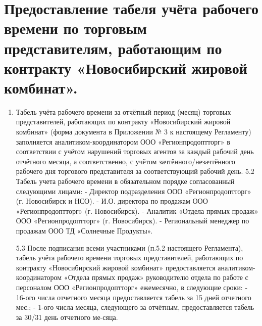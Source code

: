 \section{Предоставление табеля учёта рабочего времени по торговым представителям, работающим по контракту «Новосибирский жировой комбинат».}
\begin{enumerate}[\thesection .1]
\item Табель учёта рабочего времени за отчётный период (месяц) торговых представителей, работающих по контракту «Новосибирский жировой комбинат» (форма документа в Приложении № 3 к настоящему Регламенту) заполняется аналитиком-координатором ООО «Регионпродоптторг» в соответствии с учётом нарушений торговых агентов за каждый рабочий день отчётного месяца, а соответственно, с учётом зачтённого/незачтённого рабочего дня торгового представителя за соответствующий рабочий день. 
 5.2 Табель учета рабочего времени в обязательном порядке согласованный следующими лицами:
 - Директор подразделения ООО «Регионпродоптторг» (г. Новосибирск и НСО).
 - И.О. директора по продажам ООО «Регионпродоптторг» (г. Новосибирск).
 - Аналитик «Отдела прямых продаж» ООО «Регионпродоптторг» (г. Новосибирск). 
 - Региональный менеджер по продажам ООО ТД «Солнечные Продукты».

 5.3  После подписания всеми участниками (п.5.2 настоящего Регламента), табель учёта рабочего времени торговых представителей, работающих по контракту «Новосибирский жировой комбинат» предоставляется аналитиком-координатором «Отдела прямых продаж» руководителю отдела по работе с персоналом ООО «Регионпродоптторг» ежемесячно, в следующие сроки:
 - 16-ого числа отчетного месяца предоставляется табель за 15 дней отчетного мес.;
 - 1-ого числа месяца, следующего за отчётным, предоставляется табель за 30/31 день отчетного ме-сяца. 
 
\end{enumerate}	